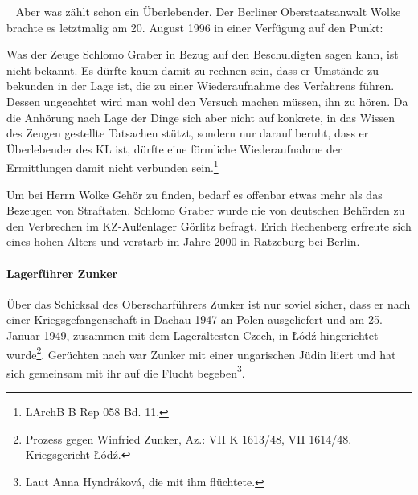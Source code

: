 ~\newline
Aber was zählt schon ein Überlebender. Der Berliner Oberstaatsanwalt Wolke brachte es letztmalig am 20. August 1996 in einer Verfügung auf den Punkt:
\begin{leftbar} 
Was der Zeuge Schlomo Graber in Bezug auf den Beschuldigten sagen kann, ist nicht bekannt. Es dürfte kaum damit zu rechnen sein, dass er Umstände zu bekunden in der Lage ist, die zu einer Wiederaufnahme des Verfahrens führen. Dessen ungeachtet wird man wohl den Versuch machen müssen, ihn zu hören. Da die Anhörung nach Lage der Dinge sich aber nicht auf konkrete, in das Wissen des Zeugen gestellte Tatsachen stützt, sondern nur darauf beruht, dass er Überlebender des KL ist, dürfte eine förmliche Wiederaufnahme der Ermittlungen damit nicht verbunden sein.\footnote{LArchB B Rep 058 Bd. 11.}
\end{leftbar}
\newpage
Um bei Herrn Wolke Gehör zu finden, bedarf es offenbar etwas mehr als das Bezeugen von Straftaten. Schlomo Graber wurde nie von deutschen Behörden zu den Verbrechen im KZ-Außenlager Görlitz befragt. Erich Rechenberg erfreute sich eines hohen Alters und verstarb im Jahre 2000 in Ratzeburg bei Berlin.


\paragraph{Lagerführer Zunker\label{zunker_ahndung}}
Über das Schicksal des Oberscharführers Zunker ist nur soviel sicher, dass er nach einer Kriegsgefangenschaft in Dachau 1947 an Polen ausgeliefert und am 25. Januar 1949, zusammen mit dem Lagerältesten Czech, in \L \'od\'z hingerichtet wurde\footnote{Prozess gegen Winfried Zunker, Az.: VII K 1613/48, VII 1614/48. Kriegsgericht \L \'od\'z.}.
Gerüchten nach war Zunker mit einer ungarischen Jüdin liiert und hat sich gemeinsam mit ihr auf die Flucht begeben\footnote{Laut Anna Hyndr\'akov\'a, die mit ihm flüchtete.}.





